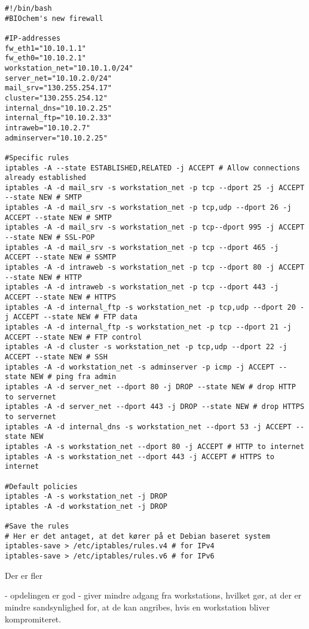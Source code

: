 \documentclass[10pt,a4paper,danish]{article}
\begin{document}
\begin{landscape}
\begin{verbatim}
#!/bin/bash
#BIOchem's new firewall

#IP-addresses
fw_eth1="10.10.1.1"
fw_eth0="10.10.2.1"
workstation_net="10.10.1.0/24"
server_net="10.10.2.0/24"
mail_srv="130.255.254.17"
cluster="130.255.254.12"
internal_dns="10.10.2.25"
internal_ftp="10.10.2.33"
intraweb="10.10.2.7"
adminserver="10.10.2.25"

#Specific rules
iptables -A --state ESTABLISHED,RELATED -j ACCEPT # Allow connections already established
iptables -A -d mail_srv -s workstation_net -p tcp --dport 25 -j ACCEPT --state NEW # SMTP
iptables -A -d mail_srv -s workstation_net -p tcp,udp --dport 26 -j ACCEPT --state NEW # SMTP
iptables -A -d mail_srv -s workstation_net -p tcp--dport 995 -j ACCEPT --state NEW # SSL-POP
iptables -A -d mail_srv -s workstation_net -p tcp --dport 465 -j ACCEPT --state NEW # SSMTP
iptables -A -d intraweb -s workstation_net -p tcp --dport 80 -j ACCEPT --state NEW # HTTP
iptables -A -d intraweb -s workstation_net -p tcp --dport 443 -j ACCEPT --state NEW # HTTPS
iptables -A -d internal_ftp -s workstation_net -p tcp,udp --dport 20 -j ACCEPT --state NEW # FTP data
iptables -A -d internal_ftp -s workstation_net -p tcp --dport 21 -j ACCEPT --state NEW # FTP control
iptables -A -d cluster -s workstation_net -p tcp,udp --dport 22 -j ACCEPT --state NEW # SSH
iptables -A -d workstation_net -s adminserver -p icmp -j ACCEPT --state NEW # ping fra admin
iptables -A -d server_net --dport 80 -j DROP --state NEW # drop HTTP to servernet
iptables -A -d server_net --dport 443 -j DROP --state NEW # drop HTTPS to servernet
iptables -A -d internal_dns -s workstation_net --dport 53 -j ACCEPT --state NEW
iptables -A -s workstation_net --dport 80 -j ACCEPT # HTTP to internet
iptables -A -s workstation_net --dport 443 -j ACCEPT # HTTPS to internet

#Default policies
iptables -A -s workstation_net -j DROP
iptables -A -d workstation_net -j DROP

#Save the rules
# Her er det antaget, at det kører på et Debian baseret system
iptables-save > /etc/iptables/rules.v4 # for IPv4
iptables-save > /etc/iptables/rules.v6 # for IPv6
\end{verbatim}
\end{landscape}
Der er fler

- opdelingen er god
    - giver mindre adgang fra workstations, hvilket gør, at der er mindre
      sandsynlighed for, at de kan angribes, hvis en workstation bliver
      kompromiteret.
\end{document}
